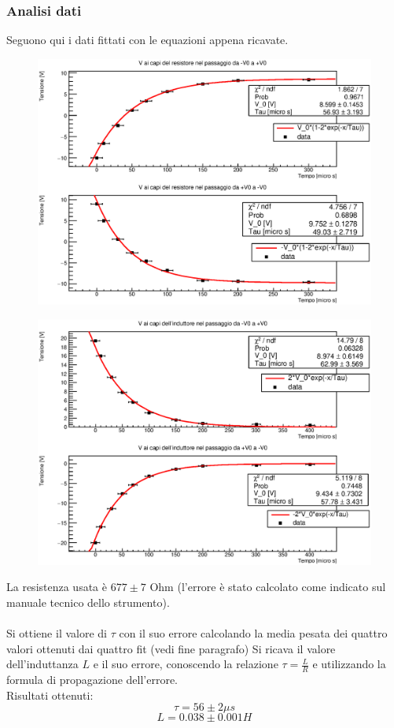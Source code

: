 \newpage
\subsubsection{Analisi dati}
Seguono qui i dati fittati con le equazioni appena ricavate.\\
%
%
    \begin{figure}[H]
    \centering
    \includegraphics[scale=0.8]{Grafici/C3_P2_RL_impulsata_resistore.eps}
    \end{figure} 
%
    \begin{figure}[H]
    \centering
    \includegraphics[scale=0.8]{Grafici/C3_P2_RL_impulsata_induttore.eps}
    \end{figure} 
%
%
La resistenza usata è $677 \pm 7$ Ohm (l'errore è stato calcolato come indicato sul manuale tecnico dello strumento).\\\\
%
%
Si ottiene il valore di $\tau$ con il suo errore calcolando la media pesata dei quattro valori ottenuti dai quattro fit (vedi fine paragrafo)
%
Si ricava il valore dell'induttanza $L$ e il suo errore, conoscendo la relazione $\tau = \frac{L}{R}$ e utilizzando la formula di propagazione dell'errore.\\

Risultati ottenuti:
$$\tau = 56 \pm 2 \mu s $$
$$ L = 0.038 \pm 0.001  H$$
